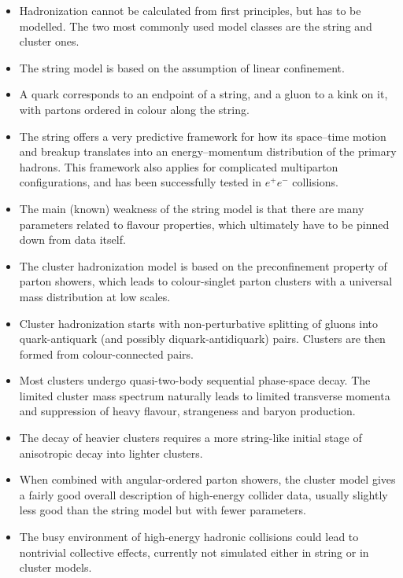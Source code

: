 \begin{itemize}
\item Hadronization cannot be calculated from first principles, but has
  to be modelled. The two most commonly used model classes are the string
  and cluster ones. 
\item The string model is based on the assumption of linear confinement.
\item A quark corresponds to an endpoint of a string, and a gluon to a
  kink on it, with partons ordered in colour along the string.
\item The string offers a very predictive framework for how its 
  space--time motion and breakup translates into an energy--momentum
  distribution of the primary hadrons. 
  This framework also applies for complicated multiparton 
  configurations, and has been successfully tested in $e^+e^-$ collisions.
\item The main (known) weakness of the string model is that there are 
  many parameters related to flavour properties, which ultimately have 
  to be pinned down from data itself.
\item The cluster hadronization model is based on the preconfinement
  property of parton showers, which leads to colour-singlet parton
  clusters with a universal mass distribution at low scales.
\item Cluster hadronization starts with non-perturbative splitting of
  gluons into quark-antiquark (and possibly diquark-antidiquark) pairs.
  Clusters are then formed from colour-connected pairs. 
\item Most clusters undergo quasi-two-body sequential phase-space
  decay.  The limited cluster mass spectrum naturally leads to limited
  transverse momenta and suppression of heavy flavour, strangeness and
  baryon production.
\item The decay of heavier clusters requires a more string-like
  initial stage of anisotropic decay into lighter clusters.
\item When combined with angular-ordered parton showers, the cluster
  model gives a fairly good overall description of high-energy
  collider data, usually slightly less good than the string model but
  with fewer parameters.
\item The busy environment of high-energy hadronic collisions could lead to
  nontrivial collective effects, currently not simulated either in string
  or in cluster models. 
\end{itemize}


